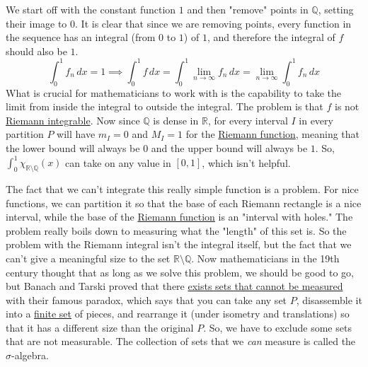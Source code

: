 We start off with the constant function $1$ and then "remove" points in $\mathbb{Q}$, setting their image to $0$. It is clear that since we are removing points, every function in the sequence has an integral (from $0$ to $1$) of $1$, and therefore the integral of $f$ should also be $1$. 
\begin{equation}
  \int_0^1 f_n \, dx = 1 \implies \int_0^1 f \,dx = \int_0^1 \lim_{n \rightarrow \infty} f_n \,dx = \lim_{n \rightarrow \infty} \int_0^1 f_n \,dx
\end{equation}
What is crucial for mathematicians to work with is the capability to take the limit from inside the integral to outside the integral. The problem is that $f$ is not \hyperref[real-def:riemann-integral]{Riemann integrable}. Now since $\mathbb{Q}$ is dense in $\mathbb{R}$, for every interval $I$ in every partition $P$ will have $m_I = 0$ and $M_I = 1$ for the \hyperref[real-ex:riemann-function]{Riemann function}, meaning that the lower bound will always be $0$ and the upper bound will always be $1$. So, $\int_0^1 \chi_{\mathbb{R} \setminus \mathbb{Q}} (x)$ can take on any value in $[0, 1]$, which isn't helpful. 

The fact that we can't integrate this really simple function is a problem. For nice functions, we can partition it so that the base of each Riemann rectangle is a nice interval, while the base of the \hyperref[real-ex:riemann-function]{Riemann function} is an "interval with holes." The problem really boils down to measuring what the "length" of this set is. So the problem with the Riemann integral isn't the integral itself, but the fact that we can't give a meaningful size to the set $\mathbb{R} \setminus \mathbb{Q}$. Now mathematicians in the 19th century thought that as long as we solve this problem, we should be good to go, but Banach and Tarski proved that there \hyperref[st-thm:strong_banach-tarski]{exists sets that cannot be measured} with their famous paradox, which says that you can take any set $P$, disassemble it into a \hyperref[st-def:finite-set]{finite set} of pieces, and rearrange it (under isometry and translations) so that it has a different size than the original $P$. So, we have to exclude some sets that are not measurable. The collection of sets that we \textit{can} measure is called the $\sigma$-algebra. 
